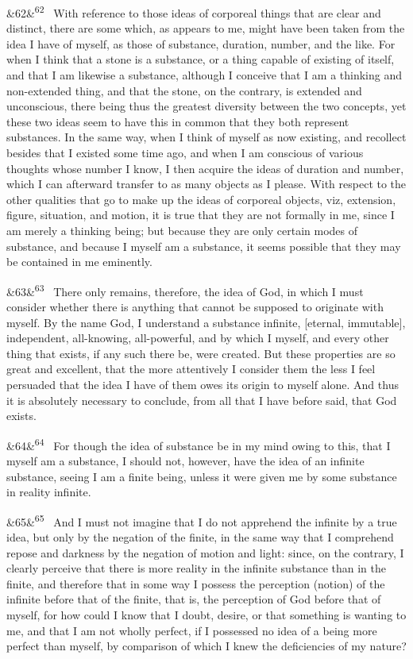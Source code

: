 \documentclass[12pt]{article}
\newcommand{\para}[1][]{\par\noindent\ifx&#1&\else\textsuperscript{\footnotesize #1}~\fi}
\begin{document}
\para[62] With reference to those ideas of corporeal things that are clear and distinct, there are some which, as appears to me, might have been taken from the idea I have of myself, as those of substance, duration, number, and the like. For when I think that a stone is a substance, or a thing capable of existing of itself, and that I am likewise a substance, although I conceive that I am a thinking and non-extended thing, and that the stone, on the contrary, is extended and unconscious, there being thus the greatest diversity between the two concepts, yet these two ideas seem to have this in common that they both represent substances. In the same way, when I think of myself as now existing, and recollect besides that I existed some time ago, and when I am conscious of various thoughts whose number I know, I then acquire the ideas of duration and number, which I can afterward transfer to as many objects as I please. With respect to the other qualities that go to make up the ideas of corporeal objects, viz, extension, figure, situation, and motion, it is true that they are not formally in me, since I am merely a thinking being; but because they are only certain modes of substance, and because I myself am a substance, it seems possible that they may be contained in me eminently.

\para[63] There only remains, therefore, the idea of God, in which I must consider whether there is anything that cannot be supposed to originate with myself. By the name God, I understand a substance infinite, [eternal, immutable], independent, all-knowing, all-powerful, and by which I myself, and every other thing that exists, if any such there be, were created. But these properties are so great and excellent, that the more attentively I consider them the less I feel persuaded that the idea I have of them owes its origin to myself alone. And thus it is absolutely necessary to conclude, from all that I have before said, that God exists.

\para[64] For though the idea of substance be in my mind owing to this, that I myself am a substance, I should not, however, have the idea of an infinite substance, seeing I am a finite being, unless it were given me by some substance in reality infinite.

\para[65] And I must not imagine that I do not apprehend the infinite by a true idea, but only by the negation of the finite, in the same way that I comprehend repose and darkness by the negation of motion and light: since, on the contrary, I clearly perceive that there is more reality in the infinite substance than in the finite, and therefore that in some way I possess the perception (notion) of the infinite before that of the finite, that is, the perception of God before that of myself, for how could I know that I doubt, desire, or that something is wanting to me, and that I am not wholly perfect, if I possessed no idea of a being more perfect than myself, by comparison of which I knew the deficiencies of my nature?
\end{document}
